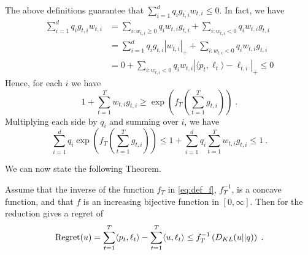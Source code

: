 The above definitions guarantee that $\sum_{i=1}^d q_i g_{t,i} w_{t,i} \le 0$. In fact, we have
\begin{align*}
\sum_{i=1}^d q_i g_{t,i} w_{t,i}
& = \sum_{i:w_{t,i}\ge 0} q_i w_{t,i} g_{t,i} + \sum_{i:w_{t,i} < 0} q_i w_{t,i} g_{t,i} \\
& = \sum_{i=1}^d q_i g_{t,i} |w_{t,i}|_+ + \sum_{i:w_{t,i} < 0} q_i w_{t,i} g_{t,i} \\
& = 0 + \sum_{i:w_{t,i} < 0} q_i w_{t,i} |\langle p_t, \ell_t\rangle - \ell_{t,i}|_+ \le 0
\end{align*}
Hence, for each $i$ we have
\[
1 + \sum_{t=1}^T w_{t,i} g_{t,i} \geq \exp\left(f_T \left( \sum_{t=1}^T g_{t,i} \right)\right) \; .
\]
Multiplying each side by $q_i$ and summing over $i$, we have
\begin{equation}
\label{eq:bounded_potential}
\sum_{i=1}^d q_i \exp\left(f_T\left(\sum_{t=1}^T g_{t,i} \right)\right) \leq 1 + \sum_{i=1}^d q_i \sum_{t=1}^T w_{t,i} g_{t,i} \le 1~.
\end{equation}

We can now state the following Theorem.
\begin{theorem}
\label{theo:expert_reduction}
Assume that the inverse of the function $f_T$ in \eqref{eq:def_f}, $f_T^{-1}$, is a concave function, and that $f$ is an increasing bijective function in $[0,\infty]$.
Then for the reduction gives a regret of 
\[
\operatorname{Regret}(u) = \sum_{t=1}^T \langle p_t, \ell_t \rangle - \sum_{t=1}^T \langle u, \ell_t \rangle \leq f_T^{-1}\left(D_{KL}(u||q)\right) \;.
\]
\end{theorem}